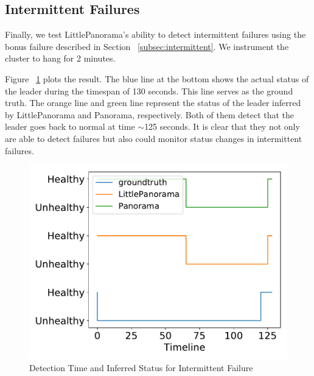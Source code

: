 \subsection{Intermittent Failures}
Finally, we test LittlePanorama's ability to detect intermittent failures using the bonus failure described in Section ~\ref{subsec:intermittent}. We instrument the cluster to hang for 2 minutes. 

Figure ~\ref{fig:transient} plots the result. The blue line at the bottom shows the actual status of the leader during the timespan of 130 seconds. This line serves as the ground truth. The orange line and green line represent the status of the leader inferred by LittlePanorama and Panorama, respectively. Both of them detect that the leader goes back to normal at time $\sim$125 seconds. It is clear that they not only are able to detect failures but also could monitor status changes in intermittent failures.

\begin{figure}[!tb]
\centering
\includegraphics[scale=0.4]{figs/transient.pdf}
\vspace{-1em}
\caption{Detection Time and Inferred Status for Intermittent Failure
\label{fig:transient}
}
\end{figure}




